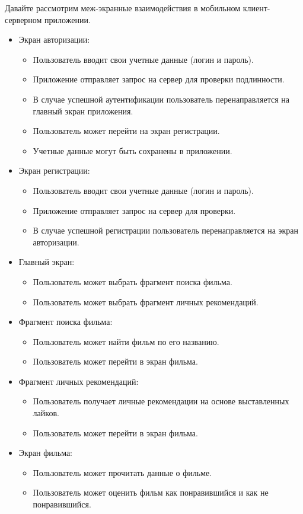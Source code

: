 Давайте рассмотрим меж-экранные взаимодействия в мобильном клиент-серверном приложении.
\begin{itemize}
	\item Экран авторизации:
	\begin{itemize}
		\item Пользователь вводит свои учетные данные (логин и пароль).
		\item Приложение отправляет запрос на сервер
		для проверки подлинности.
		\item В случае успешной аутентификации пользователь
		перенаправляется на главный экран приложения.
		\item Пользователь может перейти на экран регистрации.
		\item Учетные данные могут быть сохранены в приложении.
	\end{itemize}
	\item Экран регистрации:
	\begin{itemize}
		\item Пользователь вводит свои учетные данные (логин и пароль).
		\item Приложение отправляет запрос на сервер
		для проверки.
		\item В случае успешной регистрации пользователь
		перенаправляется на экран авторизации.
	\end{itemize}
	\item Главный экран:
	\begin{itemize}
		\item Пользователь может выбрать фрагмент поиска фильма.
		\item Пользователь может выбрать фрагмент личных рекомендаций.
	\end{itemize}
	\item Фрагмент поиска фильма:
	\begin{itemize}
		\item Пользователь может найти фильм по его названию.
		\item Пользователь может перейти в экран фильма.
	\end{itemize}
	\item Фрагмент личных рекомендаций:
	\begin{itemize}
		\item Пользователь получает личные рекомендации на основе выставленных лайков.
		\item Пользователь может перейти в экран фильма.
	\end{itemize}
	\item Экран фильма:
	\begin{itemize}
		\item Пользователь может прочитать данные о фильме.
		\item Пользователь может оценить фильм как понравившийся и как не понравившийся.
	\end{itemize}
\end{itemize}

